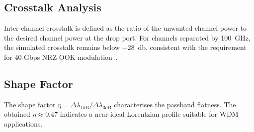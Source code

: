 \subsection{Crosstalk Analysis}
Inter-channel crosstalk is defined as the ratio of the unwanted channel
power to the desired channel power at the drop port.  For channels
separated by \SI{100}{\giga\hertz}, the simulated crosstalk remains below
\SI{-28}{\decibel}, consistent with the requirement for 40-Gbps
NRZ-OOK modulation~\cite{winzer2012optical}.

\subsection{Shape Factor}
The shape factor $\eta = \Delta\lambda_\text{1dB}/\Delta\lambda_\text{3dB}$
characterises the passband flatness. The obtained $\eta \approx 0.47$ indicates
a near-ideal Lorentzian profile suitable for WDM applications.
